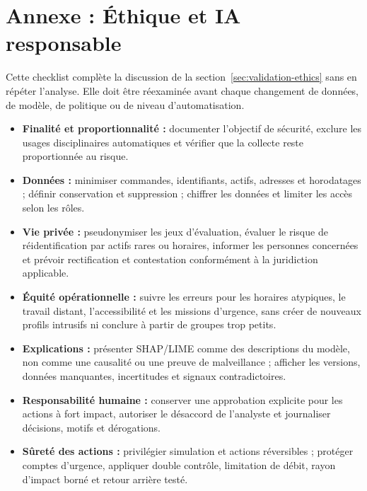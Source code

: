 \documentclass[11pt,a4paper,oneside]{report}
\theoremstyle{definition}
\theoremstyle{plain}
\begin{document}
\chapter{Annexe : Éthique et IA responsable}
\label{app:ethics}

Cette checklist complète la discussion de la
section~\ref{sec:validation-ethics} sans en répéter l'analyse. Elle doit être
réexaminée avant chaque changement de données, de modèle, de politique ou de
niveau d'automatisation.

\begin{itemize}[leftmargin=*]
  \item \textbf{Finalité et proportionnalité :} documenter l'objectif de
  sécurité, exclure les usages disciplinaires automatiques et vérifier que la
  collecte reste proportionnée au risque.

  \item \textbf{Données :} minimiser commandes, identifiants, actifs, adresses
  et horodatages ; définir conservation et suppression ; chiffrer les données
  et limiter les accès selon les rôles.

  \item \textbf{Vie privée :} pseudonymiser les jeux d'évaluation, évaluer le
  risque de réidentification par actifs rares ou horaires, informer les
  personnes concernées et prévoir rectification et contestation conformément à
  la juridiction applicable.

  \item \textbf{Équité opérationnelle :} suivre les erreurs pour les horaires
  atypiques, le travail distant, l'accessibilité et les missions d'urgence,
  sans créer de nouveaux profils intrusifs ni conclure à partir de groupes trop
  petits.

  \item \textbf{Explications :} présenter SHAP/LIME comme des descriptions du
  modèle, non comme une causalité ou une preuve de malveillance ; afficher les
  versions, données manquantes, incertitudes et signaux contradictoires.

  \item \textbf{Responsabilité humaine :} conserver une approbation explicite
  pour les actions à fort impact, autoriser le désaccord de l'analyste et
  journaliser décisions, motifs et dérogations.

  \item \textbf{Sûreté des actions :} privilégier simulation et actions
  réversibles ; protéger comptes d'urgence, appliquer double contrôle,
  limitation de débit, rayon d'impact borné et retour arrière testé.


\end{itemize}
\end{document}
